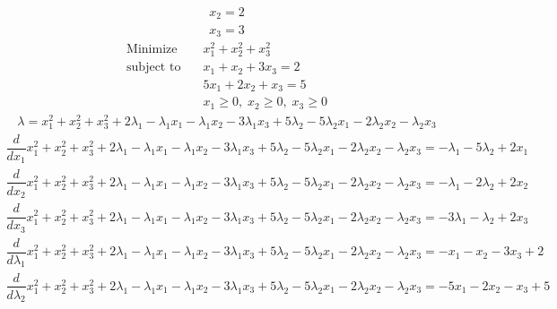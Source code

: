\documentclass{article}
\begin{document}
\begin{align*}
x_{2}=2\end{align*}
\begin{align*}
x_{3}=3\end{align*}
\begin{align*}
\text{Minimize} \quad & x_{1}^{2} + x_{2}^{2} + x_{3}^{2}\\
\text{subject to} \quad
& x_{1} + x_{2} + 3x_{3}=2\\
& 5x_{1} + 2x_{2} + x_{3}=5\\
& x_{1}\ge0,\; x_{2}\ge0,\; x_{3}\ge0\end{align*}
\begin{align*}
\lambda=x_{1}^{2} + x_{2}^{2} + x_{3}^{2} + 2\lambda_{1} - \lambda_{1}x_{1} - \lambda_{1}x_{2} - 3\lambda_{1}x_{3} + 5\lambda_{2} - 5\lambda_{2}x_{1} - 2\lambda_{2}x_{2} - \lambda_{2}x_{3}\end{align*}
\begin{align*}
\dfrac{d}{dx_{1}}x_{1}^{2} + x_{2}^{2} + x_{3}^{2} + 2\lambda_{1} - \lambda_{1}x_{1} - \lambda_{1}x_{2} - 3\lambda_{1}x_{3} + 5\lambda_{2} - 5\lambda_{2}x_{1} - 2\lambda_{2}x_{2} - \lambda_{2}x_{3}=-\lambda_{1} - 5\lambda_{2} + 2x_{1}\end{align*}
\begin{align*}
\dfrac{d}{dx_{2}}x_{1}^{2} + x_{2}^{2} + x_{3}^{2} + 2\lambda_{1} - \lambda_{1}x_{1} - \lambda_{1}x_{2} - 3\lambda_{1}x_{3} + 5\lambda_{2} - 5\lambda_{2}x_{1} - 2\lambda_{2}x_{2} - \lambda_{2}x_{3}=-\lambda_{1} - 2\lambda_{2} + 2x_{2}\end{align*}
\begin{align*}
\dfrac{d}{dx_{3}}x_{1}^{2} + x_{2}^{2} + x_{3}^{2} + 2\lambda_{1} - \lambda_{1}x_{1} - \lambda_{1}x_{2} - 3\lambda_{1}x_{3} + 5\lambda_{2} - 5\lambda_{2}x_{1} - 2\lambda_{2}x_{2} - \lambda_{2}x_{3}=-3\lambda_{1} - \lambda_{2} + 2x_{3}\end{align*}
\begin{align*}
\dfrac{d}{d\lambda_{1}}x_{1}^{2} + x_{2}^{2} + x_{3}^{2} + 2\lambda_{1} - \lambda_{1}x_{1} - \lambda_{1}x_{2} - 3\lambda_{1}x_{3} + 5\lambda_{2} - 5\lambda_{2}x_{1} - 2\lambda_{2}x_{2} - \lambda_{2}x_{3}=-x_{1} - x_{2} - 3x_{3} + 2\end{align*}
\begin{align*}
\dfrac{d}{d\lambda_{2}}x_{1}^{2} + x_{2}^{2} + x_{3}^{2} + 2\lambda_{1} - \lambda_{1}x_{1} - \lambda_{1}x_{2} - 3\lambda_{1}x_{3} + 5\lambda_{2} - 5\lambda_{2}x_{1} - 2\lambda_{2}x_{2} - \lambda_{2}x_{3}=-5x_{1} - 2x_{2} - x_{3} + 5\end{align*}
\end{document}
